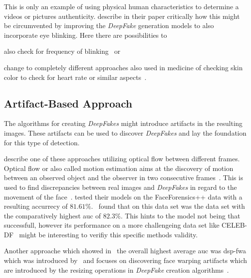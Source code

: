 \par
This is only an example of using physical human characteristics to determine a
videos or pictures authenticity. \textcite{li_ictu_2018} describe in 
their paper critically how this might be circumvented by improving the \textit{DeepFake}
generation models to also incorporate eye blinking. Here there are possibilities
to 
\begin{enumerate*}[a.)]
    \item also check for frequency of blinking~\cite{li_ictu_2018} or
    \item change to completely different approaches also used in medicine of
    checking skin color to check for heart rate or similar aspects~\cite{pishori_detecting_2020}.
\end{enumerate*}

\subsection{Artifact-Based Approach}
The algorithms for creating \textit{DeepFakes} might introduce artifacts in the resulting
images. These artifacts can be used to discover \textit{DeepFakes} and lay the foundation
for this type of detection.

\par
\textcite{amerini_deepfake_2019} describe one of these approaches utilizing optical
flow between different frames.
Optical flow or also called motion estimation aims at the discovery of motion
between an observed object and the observer in two consecutive frames~\cite{beauchemin_computation_1995}.
This is used to find discrepancies between real images and \textit{DeepFakes} in regard
to the movement of the face~\cite{amerini_deepfake_2019}.
\textcite{amerini_deepfake_2019} tested their models on the FaceForensics++ data
with a resulting accurrecy of \(81.61\%\).~\textcite{li_celeb-df_2019} found that
on this data set was the data set with the comparatively highest \gls{auc} of 
\(82.3\%\). This hints to the model not being that successfull, however its
performance on a more challengeing data set like CELEB-DF~\cite{li_celeb-df_2019}
might be interesting to verifiy this specific methods validity.

\par
Another approache which showed in~\cite{li_celeb-df_2019} the overall highest
average \gls{auc} was \gls{dsp-fwa} which was introduced by~\cite{he_spatial_2014}
and focuses on discovering face warping artifacts which are introduced by the 
resizing operations in \textit{DeepFake} creation algorithms~\cite{li_celeb-df_2019,he_spatial_2014}.

